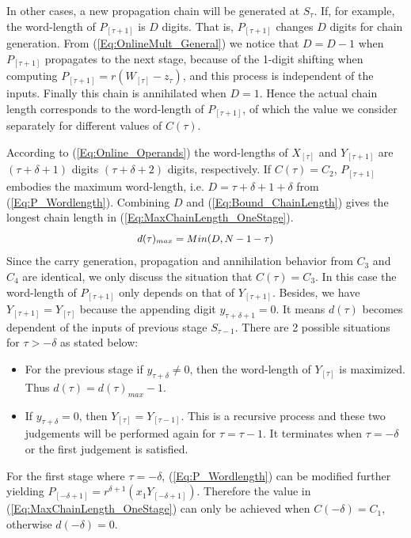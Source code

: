 \documentclass{acm_proc_article-sp}
\begin{document}
%
In other cases, a new propagation chain will be generated at $S_{\tau}$. If, for example, the word-length of $P_{[\tau+1]}$ is $D$ digits. That is, $P_{[\tau+1]}$ changes $D$ digits for chain generation. From (\ref{Eq:OnlineMult_General}) we notice that $D=D-1$ when $P_{[\tau+1]}$ propagates to the next stage, because of the 1-digit shifting when computing $P_{[\tau+1]}=r(W_{[\tau]}-z_{\tau})$, and this process is independent of the inputs. Finally this chain is annihilated when $D=1$. Hence the actual chain length corresponds to the word-length of $P_{[\tau+1]}$, of which the value we consider separately for different values of $C(\tau)$.\vspace{-1ex}

According to (\ref{Eq:Online_Operands}) the word-lengths of $X_{[\tau]}$ and $Y_{[\tau+1]}$ are $(\tau+\delta+1)$ digits $(\tau+\delta+2)$ digits, respectively. If $C(\tau)=C_2$, $P_{[\tau+1]}$ embodies the maximum word-length, i.e. $D=\tau+\delta+1+\delta$ from (\ref{Eq:P_Wordlength}). Combining $D$ and (\ref{Eq:Bound_ChainLength}) gives the longest chain length in (\ref{Eq:MaxChainLength_OneStage}).
%
\begin{eqnarray}\label{Eq:MaxChainLength_OneStage}
\footnotesize
  d(\tau)_{max}=Min(D,N-1-\tau)
\normalsize
\end{eqnarray}
%
Since the carry generation, propagation and annihilation behavior from $C_3$ and $C_4$ are identical, we only discuss the situation that $C(\tau)=C_3$. In this case the word-length of $P_{[\tau+1]}$ only depends on that of $Y_{[\tau+1]}$. Besides, we have $Y_{[\tau+1]}=Y_{[\tau]}$ because the appending digit $y_{\tau+\delta+1}=0$. It means $d(\tau)$ becomes dependent of the inputs of previous stage $S_{\tau-1}$. There are 2 possible situations for $\tau>-\delta$ as stated below:
\vspace{-2.5ex}
\begin{itemize}
  \item For the previous stage if $y_{\tau+\delta}\neq0$, then the word-length of $Y_{[\tau]}$ is maximized. Thus $d(\tau)=d(\tau)_{max}-1$.\vspace{-1ex}
  \item If $y_{\tau+\delta}=0$, then $Y_{[\tau]}=Y_{[\tau-1]}$. This is a recursive process and these two judgements will be performed again for $\tau=\tau-1$. It terminates when $\tau=-\delta$ or the first judgement is satisfied.
\end{itemize}
\vspace{-1.5ex}
%
For the first stage where $\tau=-\delta$, (\ref{Eq:P_Wordlength}) can be modified further yielding $P_{[-\delta+1]}=r^{\delta+1}(x_1Y_{[-\delta+1]})$. Therefore the value in (\ref{Eq:MaxChainLength_OneStage}) can only be achieved when $C(-\delta)=C_1$, otherwise $d(-\delta)=0$.\vspace{-1ex}
\end{document}
